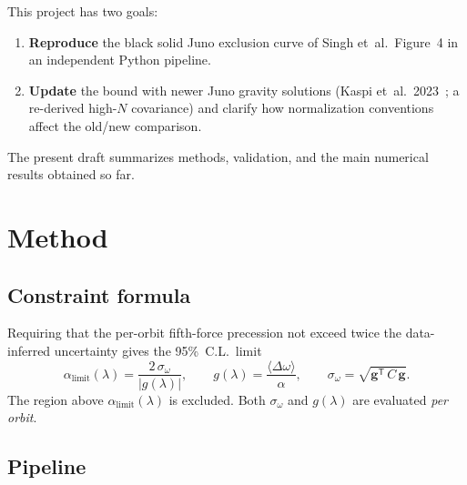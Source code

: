 \documentclass[11pt,a4paper]{article}
\begin{document}
This project has two goals:
\begin{enumerate}
  \item \textbf{Reproduce} the black solid Juno exclusion curve of Singh
        et~al.\ Figure~4 in an independent Python pipeline.
  \item \textbf{Update} the bound with newer Juno gravity solutions
        (Kaspi et~al.\ 2023~\cite{Kaspi2023}; a re-derived high-\(N\)
        covariance) and clarify how normalization conventions affect the
        old/new comparison.
\end{enumerate}
The present draft summarizes methods, validation, and the main numerical
results obtained so far.

\section{Method}

\subsection{Constraint formula}

Requiring that the per-orbit fifth-force precession not exceed twice the
data-inferred uncertainty gives the 95\%~C.L.\ limit
\begin{equation}
  \alpha_{\mathrm{limit}}(\lambda)
  =
  \frac{2\,\sigma_\omega}{|g(\lambda)|},
  \qquad
  g(\lambda)=\frac{\langle\Delta\omega\rangle}{\alpha},
  \qquad
  \sigma_\omega=\sqrt{\mathbf{g}^{\mathsf T}\,C\,\mathbf{g}}.
\end{equation}
The region above \(\alpha_{\mathrm{limit}}(\lambda)\) is excluded. Both
\(\sigma_\omega\) and \(g(\lambda)\) are evaluated \emph{per orbit}.

\subsection{Pipeline}
\end{document}
